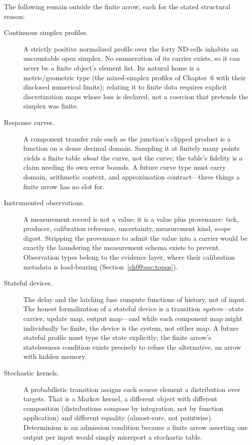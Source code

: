 \begin{boundary}\label{ch09:bd:outside}
The following remain outside the finite arrow, each for the stated structural reason:
\begin{description}
\item[Continuous simplex profiles.] A strictly positive normalized profile over the forty ND-cells inhabits an uncountable open simplex. No enumeration of its carrier exists, so it can never be a finite object's element list. Its natural home is a metric/geometric type (the mixed-simplex profiles of Chapter~6 with their disclosed numerical limits); relating it to finite data requires explicit discretization maps whose loss is declared, not a coercion that pretends the simplex was finite.
\item[Response curves.] A component transfer rule such as the junction's clipped product is a function on a dense decimal domain. Sampling it at finitely many points yields a finite table \emph{about} the curve, not the curve; the table's fidelity is a claim needing its own error bounds. A future curve type must carry domain, arithmetic context, and approximation contract---three things a finite arrow has no slot for.
\item[Instrumented observations.] A measurement record is not a value; it is a value plus provenance: tick, producer, calibration reference, uncertainty, measurement kind, scope digest. Stripping the provenance to admit the value into a carrier would be exactly the laundering the measurement schema exists to prevent. Observation types belong to the evidence layer, where their calibration metadata is load-bearing (Section~\ref{ch09:sec:topos}).
\item[Stateful devices.] The delay and the latching fuse compute functions of history, not of input. The honest formalization of a stateful device is a transition \emph{system}---state carrier, update map, output map---and while each component map might individually be finite, the device is the system, not either map. A future stateful profile must type the state explicitly; the finite arrow's statelessness condition exists precisely to refuse the alternative, an arrow with hidden memory.
\item[Stochastic kernels.] A probabilistic transition assigns each source element a distribution over targets. That is a Markov kernel, a different object with different composition (distributions compose by integration, not by function application) and different equality (almost-sure, not pointwise). Determinism is an admission condition because a finite arrow asserting one output per input would simply misreport a stochastic table.

\end{description}
\end{boundary}
